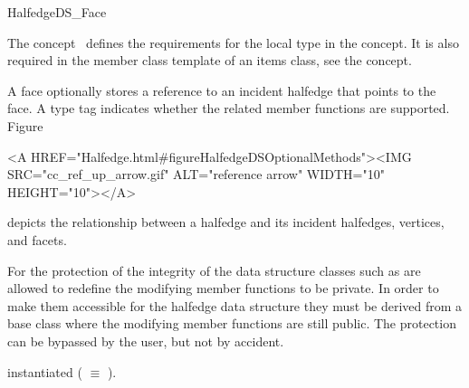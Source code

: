 
\ccRefPageBegin



\begin{ccRefConcept}{HalfedgeDS_Face}
\label{pageHalfedgeDSItemsFaceRef}

\ccDefinition
  
The concept \ccRefName\ defines the requirements for the local  
type in the  concept. It is also required in 
the  member class template of an
items class, see the  concept.

A face optionally stores a reference to an incident halfedge that
points to the face.  A type tag indicates whether the related member
functions are supported. Figure~\begin{ccHtmlOnly}
  <A HREF="Halfedge.html#figureHalfedgeDSOptionalMethods"><IMG 
  SRC="cc_ref_up_arrow.gif" ALT="reference arrow" WIDTH="10" HEIGHT="10"></A>
\end{ccHtmlOnly}
depicts the relationship between a halfedge and its incident
halfedges, vertices, and facets.

For the protection of the integrity of the data structure classes such as
 are allowed to redefine the modifying member 
functions to be private. In order to make them accessible for the 
halfedge data structure they must be derived from a base class 
where the modifying member functions are still public. The protection 
can be bypassed by the user, but not by accident.

\ccTypes

\ccThreeToTwo

    {instantiated  ( $\equiv$ ).}
\ccGlue
{}
\ccGlue
{}
\ccGlue
{}
\ccGlue
{}
\ccGlue
{}
\ccGlue
{}
\ccGlue
{}
\ccGlue
{}
\ccGlue
{}
\ccGlue
{}


\end{ccRefConcept}
